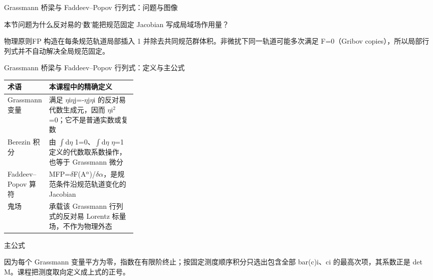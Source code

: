 \begin{frame}[t]{Grassmann 桥梁与 Faddeev--Popov 行列式：问题与图像}
\footnotesize
\begin{block}{本节问题}为什么反对易的‘数’能把规范固定 Jacobian 写成局域场作用量？\end{block}
\begin{block}{物理原则}\quad FP 构造在每条规范轨道局部插入 1 并除去共同规范群体积。非微扰下同一轨道可能多次满足 F=0（Gribov copies），所以局部行列式并不自动解决全局规范固定。\end{block}
\end{frame}

\begin{frame}[t]{Grassmann 桥梁与 Faddeev--Popov 行列式：定义与主公式}
\footnotesize\begin{tabularx}{\linewidth}{p{0.30\linewidth}Y}
\toprule 术语 & 本课程中的精确定义\\\midrule
{} Grassmann 变量 & 满足 \ensuremath{\eta}i\ensuremath{\eta}j=-\ensuremath{\eta}j\ensuremath{\eta}i 的反对易代数生成元，因而 \ensuremath{\eta}i\ensuremath{^{2}}=0；它不是普通实数或复数\\
 Berezin 积分 & 由 \ensuremath{\int}d\ensuremath{\eta} 1=0、\ensuremath{\int}d\ensuremath{\eta} \ensuremath{\eta}=1 定义的代数取系数操作，也等于 Grassmann 微分\\
 Faddeev--Popov 算符 & MFP=\ensuremath{\delta}F(A\ensuremath{^{\alpha}})/\allowbreak{}\ensuremath{\delta}\ensuremath{\alpha}，是规范条件沿规范轨道变化的 Jacobian\\
 鬼场 & 承载该 Grassmann 行列式的反对易 Lorentz 标量场，不作为物理外态\\
\bottomrule\end{tabularx}\vspace{0.15cm}
\begin{block}{ 主公式}\centering{}\end{block}
因为每个 Grassmann 变量平方为零，指数在有限阶终止；按固定测度顺序积分只选出包含全部 bar(c)i、ci 的最高次项，其系数正是 det M。课程把测度取向定义成上式的正号。
\end{frame}

